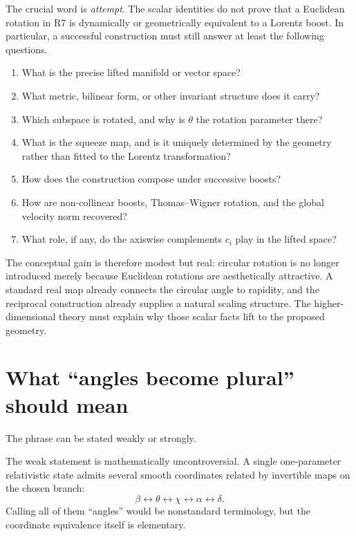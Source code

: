 \documentclass[11pt]{article}
\begin{document}
The crucial word is \emph{attempt}. The scalar identities do not prove that
a Euclidean rotation in R7 is dynamically or geometrically equivalent to a
Lorentz boost. In particular, a successful construction must still answer at
least the following questions.

\begin{enumerate}[label=(\arabic*)]
\item What is the precise lifted manifold or vector space?
\item What metric, bilinear form, or other invariant structure does it carry?
\item Which subspace is rotated, and why is $\theta$ the rotation parameter
there?
\item What is the squeeze map, and is it uniquely determined by the geometry
rather than fitted to the Lorentz transformation?
\item How does the construction compose under successive boosts?
\item How are non-collinear boosts, Thomas--Wigner rotation, and the global
velocity norm recovered?
\item What role, if any, do the axiswise complements $c_i$ play in the lifted
space?
\end{enumerate}

The conceptual gain is therefore modest but real: circular rotation is no
longer introduced merely because Euclidean rotations are aesthetically
attractive. A standard real map already connects the circular angle to
rapidity, and the reciprocal construction already supplies a natural scaling
structure. The higher-dimensional theory must explain why those scalar facts
lift to the proposed geometry.

\section{What ``angles become plural'' should mean}

The phrase can be stated weakly or strongly.

The weak statement is mathematically uncontroversial. A single
one-parameter relativistic state admits several smooth coordinates related by
invertible maps on the chosen branch:
\begin{equation}
\beta
\longleftrightarrow
\theta
\longleftrightarrow
\chi
\longleftrightarrow
\alpha
\longleftrightarrow
\delta.
\label{eq:coordinatechain}
\end{equation}
Calling all of them ``angles'' would be nonstandard terminology, but the
coordinate equivalence itself is elementary.
\end{document}

